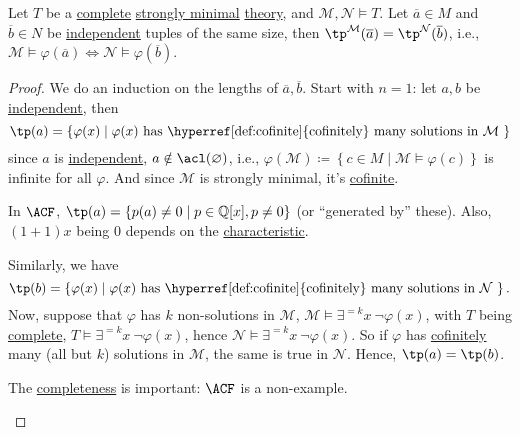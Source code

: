\begin{lemma}\label{lma:lec19-1}
	Let \(T\) be a \hyperref[def:theory-complete]{complete} \hyperref[def:strongly-minimal]{strongly minimal} \hyperref[def:theory]{theory}, and \(\mathcal{M} , \mathcal{N} \models T\). Let \(\overline{a} \in M\) and \(\overline{b} \in N\) be \hyperref[def:independent]{independent} tuples of the same size, then \(\tp^{\mathcal{M} }(\overline{a} ) = \tp^{\mathcal{N} }(\overline{b} )\), i.e., \(\mathcal{M} \models \varphi (\overline{a} ) \iff \mathcal{N} \models \varphi (\overline{b} )\).
\end{lemma}
\begin{proof}
	We do an induction on the lengths of \(\overline{a} , \overline{b} \). Start with \(n = 1\): let \(a, b\) be \hyperref[def:independent]{independent}, then
	\[
		\tp(a) = \left\{ \varphi (x) \mid \text{\(\varphi (x)\) has \hyperref[def:cofinite]{cofinitely} many solutions in \(\mathcal{M} \) }\right\}
	\]
	since \(a\) is \hyperref[def:independent]{independent}, \(a \notin \acl(\varnothing )\), i.e., \(\varphi (\mathcal{M} ) \coloneqq \left\{ c\in M \mid \mathcal{M} \models \varphi (c) \right\} \) is infinite for all \(\varphi \). And since \(\mathcal{M} \) is strongly minimal, it's \hyperref[def:cofinite]{cofinite}.

	\begin{eg}
		In \(\ACF\), \(\tp(a) = \left\{ p(a) \neq 0 \mid p\in \mathbb{Q} [x], p \neq 0 \right\} \) (or ``generated by'' these). Also, \((1 + 1) x\) being \(0\) depends on the \hyperref[def:characteristic]{characteristic}.
	\end{eg}

	Similarly, we have
	\[
		\tp(b) = \left\{ \varphi (x) \mid \text{\(\varphi (x)\) has \hyperref[def:cofinite]{cofinitely} many solutions in \(\mathcal{N} \) }\right\}.
	\]
	Now, suppose that \(\varphi \) has \(k\) non-solutions in \(\mathcal{M} \), \(\mathcal{M} \models \exists ^{=k} x\ \lnot \varphi (x)\), with \(T\) being \hyperref[def:theory-complete]{complete}, \(T \models \exists ^{=k} x\ \lnot \varphi (x)\), hence \(\mathcal{N} \models \exists ^{=k} x\ \lnot \varphi (x)\). So if \(\varphi \) has \hyperref[def:cofinite]{cofinitely} many (all but \(k\)) solutions in \(\mathcal{M} \), the same is true in \(\mathcal{N} \). Hence, \(\tp(a) = \tp(b)\).

	\begin{eg}
		The \hyperref[def:theory-complete]{completeness} is important: \(\ACF\) is a non-example.
	\end{eg}


\end{proof}
